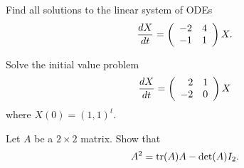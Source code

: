\documentclass{ximera}
\begin{document}
\begin{exercise} \label{c6.6.3}
Find all solutions to the linear system of ODEs
\[
\frac{dX}{dt} = \left(\begin{array}{rr} -2 & 4\\ -1 &1\end{array}\right) X.
\]
\end{exercise}

\begin{exercise} \label{c6.6.4}
Solve the initial value problem
\[
\frac{dX}{dt} =  \left(\begin{array}{rr} 2 & 1\\ -2 &0\end{array}\right)X
\]
where $X(0)=(1,1)^t$.
\end{exercise}

\begin{exercise}  \label{c6.CH}
Let $A$ be a $2\times 2$ matrix.  Show that
\[
A^2 = {\rm tr}(A)A-\det(A)I_2.
\]
\end{exercise}
\end{document}

